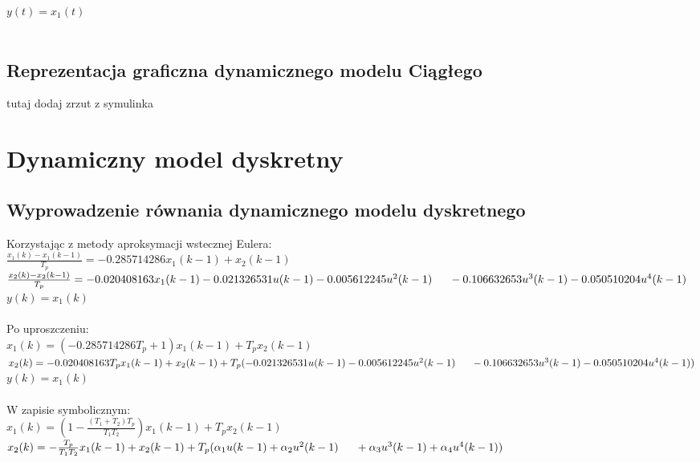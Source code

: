 \documentclass[a4paper, 11pt]{article}
\begin{document}
$y(t) = x_{1}(t)$
\\
\\
\subsection{Reprezentacja graficzna dynamicznego modelu Ciągłego}
tutaj dodaj zrzut z symulinka

\section{Dynamiczny model dyskretny}

\subsection{Wyprowadzenie równania dynamicznego modelu dyskretnego}

Korzystając z metody aproksymacji wstecznej Eulera: 
\\

$\frac{x_1(k)- x_1(k-1)}{T_p} = -0.285714286x_1(k-1) +x_2(k-1)$
\\

$\frac{x_2(k)- x_2(k-1)}{T_p} = - 0.020408163x_1(k-1) - 0.021326531u(k-1) - 0.005612245u^2(k-1)\\
	\indent	- 0.106632653u^3(k-1) - 0.050510204u^4(k-1)$
\\

$y(k) = x_1(k)$
\\
\\
Po uproszczeniu: 
\\

$x_1(k) =(-0.285714286T_p+1)x_1(k-1)+T_px_2(k-1) $
\\

$x_2(k) = - 0.020408163T_px_1(k-1) + x_2(k-1) + T_p(-0.021326531u(k-1)-0.005612245u^2(k-1)\\
	\indent	- 0.106632653u^3(k-1)-0.050510204u^4(k-1))$
\\

$y(k) = x_1(k)$
\\
\\
W zapisie symbolicznym:
\\

$x_1(k) =(1-\frac{(T_1 + T_2)T_p}{T_1T_2})x_1(k-1)+T_px_2(k-1) $
\\

$x_2(k) = - \frac{T_p}{T_1T_2}x_1(k-1) + x_2(k-1) + T_p(\alpha_1u(k-1)+\alpha_2u^2(k-1)\\
	\indent	+ \alpha_3u^3(k-1)+\alpha_4u^4(k-1))$
\\
\end{document}
